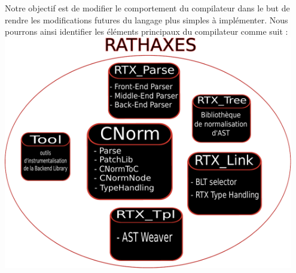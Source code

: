 \documentclass{rtxreport}
\begin{document}
Notre objectif est de modifier le comportement du compilateur dans le but de
rendre les modifications futures du langage plus simples à implémenter.
Nous pourrons ainsi identifier les éléments principaux du compilateur comme
suit :
\includegraphics[width=0.95\textwidth]{diagramme_architecture.pdf}
\end{document}
